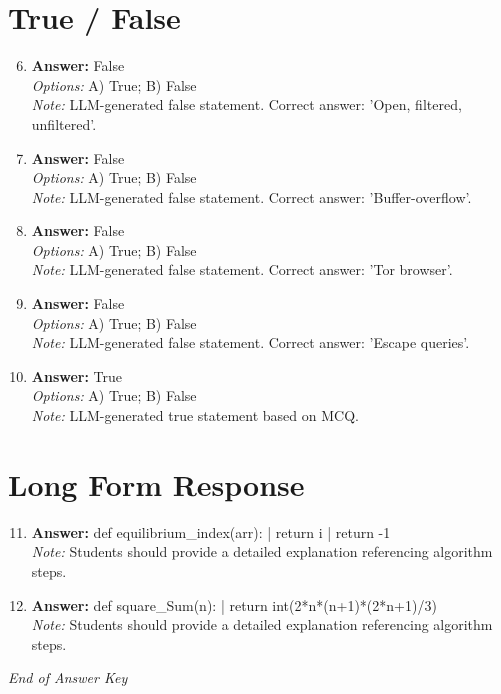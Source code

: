 \documentclass[12pt]{article}
\begin{document}
\section*{True / False}
\begin{enumerate}[label=\arabic*.]
\setcounter{enumi}{5}
\item \textbf{Answer:} False
\\ \textit{Options:} A) True; B) False
\\ \textit{Note:} LLM-generated false statement. Correct answer: 'Open, filtered, unfiltered'.
\item \textbf{Answer:} False
\\ \textit{Options:} A) True; B) False
\\ \textit{Note:} LLM-generated false statement. Correct answer: 'Buffer-overflow'.
\item \textbf{Answer:} False
\\ \textit{Options:} A) True; B) False
\\ \textit{Note:} LLM-generated false statement. Correct answer: 'Tor browser'.
\item \textbf{Answer:} False
\\ \textit{Options:} A) True; B) False
\\ \textit{Note:} LLM-generated false statement. Correct answer: 'Escape queries'.
\item \textbf{Answer:} True
\\ \textit{Options:} A) True; B) False
\\ \textit{Note:} LLM-generated true statement based on MCQ.
\end{enumerate}

\section*{Long Form Response}
\begin{enumerate}[label=\arabic*.]
\setcounter{enumi}{10}
\item \textbf{Answer:} def equilibrium\_index(arr): | return i | return -1
\\ \textit{Note:} Students should provide a detailed explanation referencing algorithm steps.
\item \textbf{Answer:} def square\_Sum(n): | return int(2*n*(n+1)*(2*n+1)/3)
\\ \textit{Note:} Students should provide a detailed explanation referencing algorithm steps.
\end{enumerate}

\vfill
\noindent\textit{End of Answer Key}
\end{document}
